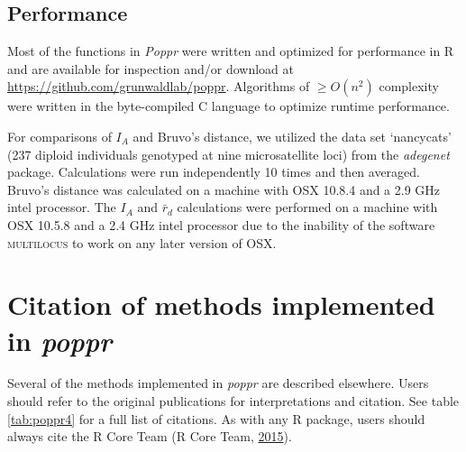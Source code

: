 \documentclass[double,12pt]{beavtex}
\begin{document}
  \subsection{Performance}\label{performance}
  
  Most of the functions in \emph{Poppr} were written and optimized for
  performance in R and are available for inspection and/or download at
  \url{https://github.com/grunwaldlab/poppr}. Algorithms of
  \(\geq O(n^2)\) complexity were written in the byte-compiled C language
  to optimize runtime performance.
  
  For comparisons of \(I_A\) and Bruvo's distance, we utilized the data
  set `nancycats' (237 diploid individuals genotyped at nine
  microsatellite loci) from the \emph{adegenet} package. Calculations were
  run independently 10 times and then averaged. Bruvo's distance was
  calculated on a machine with OSX 10.8.4 and a 2.9 GHz intel processor.
  The \(I_A\) and \(\bar{r}_d\) calculations were performed on a machine
  with OSX 10.5.8 and a 2.4 GHz intel processor due to the inability of
  the software \textsc{multilocus} to work on any later version of OSX.
  
  \section{\texorpdfstring{Citation of methods implemented in
  \emph{poppr}}{Citation of methods implemented in poppr}}\label{citation-of-methods-implemented-in-poppr}
  
  Several of the methods implemented in \emph{poppr} are described
  elsewhere. Users should refer to the original publications for
  interpretations and citation. See table \ref{tab:poppr4} for a full list
  of citations. As with any R package, users should always cite the R Core
  Team (R Core Team, \protect\hyperlink{ref-R}{2015}).
  
\end{document}
